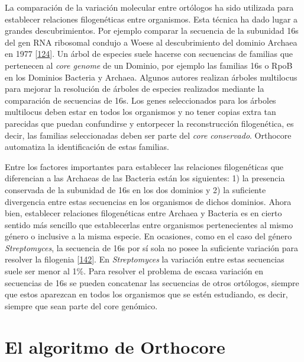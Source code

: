 \documentclass[12pt,twoside]{reedthesis}
\begin{document}
  La comparación de la variación molecular entre ortólogos ha sido
  utilizada para establecer relaciones filogenéticas entre organismos.
  Esta técnica ha dado lugar a grandes descubrimientos. Por ejemplo
  comparar la secuencia de la subunidad 16s del gen RNA ribosomal condujo
  a Woese al descubrimiento del dominio Archaea en 1977
  {[}\protect\hyperlink{ref-woese_phylogenetic_1977}{124}{]}. Un árbol de
  especies suele hacerse con secuencias de familias que pertenecen al
  \emph{core genome} de un Dominio, por ejemplo las familias 16s o RpoB en
  los Dominios Bacteria y Archaea. Algunos autores realizan árboles
  multilocus para mejorar la resolución de árboles de especies realizados
  mediante la comparación de secuencias de 16s. Los genes seleccionados
  para los árboles multilocus deben estar en todos los organismos y no
  tener copias extra tan parecidas que puedan confundirse y entorpecer la
  reconstrucción filogenética, es decir, las familias seleccionadas deben
  ser parte del \emph{core conservado}. Orthocore automatiza la
  identificación de estas familias.
  
  Entre los factores importantes para establecer las relaciones
  filogenéticas que diferencian a las Archaeas de las Bacteria están los
  siguientes: 1) la presencia conservada de la subunidad de 16s en los dos
  dominios y 2) la suficiente divergencia entre estas secuencias en los
  organismos de dichos dominios. Ahora bien, establecer relaciones
  filogenéticas entre Archaea y Bacteria es en cierto sentido más sencillo
  que establecerlas entre organismos pertenecientes al mismo género o
  inclusive a la misma especie. En ocasiones, como en el caso del género
  \emph{Streptomyces}, la secuencia de 16s por sí sola no posee la
  suficiente variación para resolver la filogenia
  {[}\protect\hyperlink{ref-labeda_phylogenetic_2017}{142}{]}. En
  \emph{Streptomyces} la variación entre estas secuencias suele ser menor
  al 1\%. Para resolver el problema de escasa variación en secuencias de
  16s se pueden concatenar las secuencias de otros ortólogos, siempre que
  estos aparezcan en todos los organismos que se estén estudiando, es
  decir, siempre que sean parte del core genómico.
  
  \section{El algoritmo de Orthocore}\label{el-algoritmo-de-orthocore}
  
\end{document}
